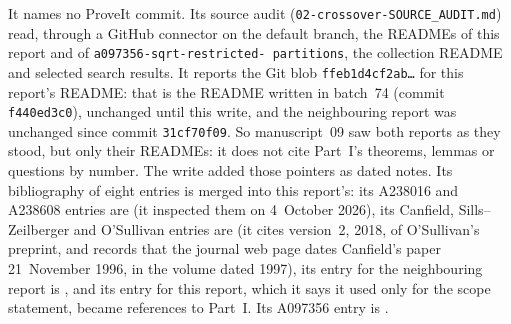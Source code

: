 \documentclass[11pt]{article}
\theoremstyle{definition}
\theoremstyle{remark}
\numberwithin{equation}{section}
\begin{document}
It names no ProveIt commit. Its source audit
(\nolinkurl{02-crossover-SOURCE_AUDIT.md}) read, through a GitHub connector on
the default branch, the READMEs of this report and of
\texttt{a097356-\allowbreak sqrt-\allowbreak restricted-\allowbreak
partitions}, the collection README and selected search results. It
reports the Git blob \texttt{ffeb1d4cf2ab\ldots} for this report's README:
that is the README written in batch~74 (commit \texttt{f440ed3c0}),
unchanged until this write, and the neighbouring report was unchanged
since commit \texttt{31cf70f09}. So manuscript~09 saw both reports as they
stood, but only their READMEs: it does not cite Part~I's theorems, lemmas
or questions by number. The write added those pointers as dated notes. Its
bibliography of eight entries is merged into this report's: its A238016 and
A238608 entries are \cite{oeis238016,oeis238608} (it inspected them on
4~October 2026), its Canfield, Sills--Zeilberger and O'Sullivan entries are
\cite{canfield,sillszeilberger,osullivan} (it cites version~2, 2018, of
O'Sullivan's preprint, and records that the journal web page dates
Canfield's paper 21~November 1996, in the volume dated 1997), its entry for
the neighbouring report is \cite{rpc-a097356}, and its entry for this
report, which it says it used only for the scope statement, became
references to Part~I. Its A097356 entry is \cite{rpc-cx-oeis097356}.
\end{document}
